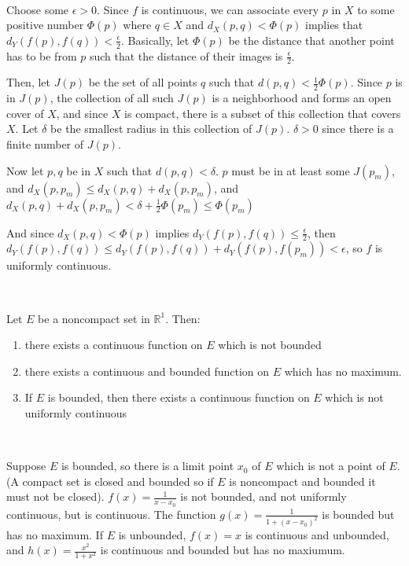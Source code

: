 \documentclass{article}
\begin{document}
\begin{customproof}
\

Choose some $\epsilon >0$. Since $f$ is continuous, we can associate every $p$ in $X$ to some positive number $\Phi (p)$ where $q \in X$ and $d_X(p,q) < \Phi(p)$ implies that $d_Y(f(p), f(q)) < \frac{\epsilon}{2}$. Basically, let $\Phi(p)$ be the distance that another point has to be from $p$ such that the distance of their images is $\frac{\epsilon}{2}$. 

Then, let $J(p)$ be the set of all points $q$ such that $d(p,q) < \frac{1}{2} \Phi(p)$. Since $p$ is in $J(p)$, the collection of all such $J(p)$ is a neighborhood and forms an open cover of $X$, and since $X$ is compact, there is a subset of this collection that covers $X$. Let $\delta$ be the smallest radius in this collection of $J(p)$. $\delta > 0$ since there is a finite number of $J(p)$.

Now let $p,q$ be in $X$ such that $d(p,q) < \delta$. $p$ must be in at least some $J(p_m)$, and $d_X(p, p_m) \leq d_X(p,q) + d_X(p, p_m)$, and $d_X(p,q) + d_X(p, p_m) < \delta + \frac{1}{2} \Phi(p_m) \leq \Phi(p_m)$

And since $d_X(p,q) < \Phi(p)$ implies $d_Y(f(p), f(q)) \leq \frac{\epsilon}{2}$, then $d_Y(f(p), f(q)) \leq d_Y(f(p), f(q)) + d_Y(f(p), f(p_m)) < \epsilon$, so $f$ is uniformly continuous.
\end{customproof}

\begin{theorem}
\

Let $E$ be a noncompact set in $\mathbb{R}^1$. Then: \begin{enumerate}
    \item there exists a continuous function on $E$ which is not bounded
    \item there exists a continuous and bounded function on $E$ which has no maximum. 
    \item If $E$ is bounded, then there exists a continuous function on $E$ which is not uniformly continuous
\end{enumerate}
\end{theorem}

\begin{customproof}
\

Suppose $E$ is bounded, so there is a limit point $x_0$ of $E$ which is not a point of $E$. (A compact set is closed and bounded so if $E$ is noncompact and bounded it must not be closed). $f(x) = \frac{1}{x-x_0}$ is not bounded, and not uniformly continuous, but is continuous. The function $g(x) = \frac{1}{1+(x-x_0)^2}$ is bounded but has no maximum. If $E$ is unbounded, $f(x) = x$ is continuous and unbounded, and $h(x) = \frac{x^2}{1+x^2}$ is continuous and bounded but has no maxiumum. 
\end{customproof}
\end{document}
